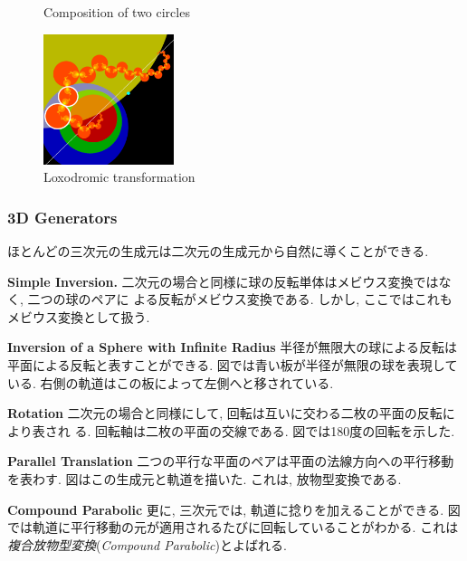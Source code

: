 \begin{figure}[h!tbp]
\begin{minipage}[]{0.75\hsize}
\begin{subfigure}{0.24\textwidth}
 \end{subfigure}
  \hspace*{\fill}
  \caption{Composition of two circles}
 \end{minipage}
 \begin{minipage}[]{0.21\hsize}
  \begin{center}
   \includegraphics[width=1.5in, height=1.5in, keepaspectratio]{../img/klein/2diis/loxodromicEdged.pdf}
   \caption{Loxodromic transformation}
   \label{fig:loxodromic2d}
  \end{center}

 \end{minipage}
\end{figure}

\subsubsection{3D Generators}
ほとんどの三次元の生成元は二次元の生成元から自然に導くことができる.

\noindent\textbf{Simple Inversion.}
二次元の場合と同様に球の反転単体はメビウス変換ではなく, 二つの球のペアに
よる反転がメビウス変換である.
しかし, ここではこれもメビウス変換として扱う.

\noindent\textbf{Inversion of a Sphere with Infinite Radius}
半径が無限大の球による反転は平面による反転と表すことができる.
図では青い板が半径が無限の球を表現している.
右側の軌道はこの板によって左側へと移されている.

\noindent\textbf{Rotation}
二次元の場合と同様にして, 回転は互いに交わる二枚の平面の反転により表され
る.
回転軸は二枚の平面の交線である.
図では180度の回転を示した.

\noindent\textbf{Parallel Translation}
二つの平行な平面のペアは平面の法線方向への平行移動を表わす.
図はこの生成元と軌道を描いた.
これは, 放物型変換である.

\noindent\textbf{Compound Parabolic}
更に, 三次元では, 軌道に捻りを加えることができる.
図では軌道に平行移動の元が適用されるたびに回転していることがわかる.
これは\emph{複合放物型変換}(\textit{Compound Parabolic})とよばれる.

